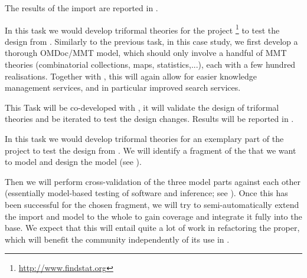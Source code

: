 \begin{workpackage}[id=dksbases,%
  title=Data/Knowledge/Software-Bases,lead=JU,
  ZHRM=12,JURM=46,UWRM=25,SARM=10,LLRM=2,PSRM=4]
\begin{tasklist}
\begin{task}[title=OEIS Case Study (Coverage and automated Import),id=data-OEIS,lead=JU
,PM=6,wphases=12-18]
The results of the import are reported in .
\end{task}


\begin{task}[title=FindStat Case Study (Triformal Theories),id=data-findstat,
  lead=JU,partners={ZH},PM=9,wphases=18-30!.5]
  In this task we would develop triformal theories for the \FindStat project \footnote{\url{http://www.findstat.org}} to test the
  design from .  Similarly to the previous task, in this
  case study, we first develop a thorough OMDoc/MMT model, which should only involve a
  handful of MMT theories (combinatorial collections, maps, statistics,...), each with a
  few hundred realisations. Together with   , this will again allow for
  easier knowledge management services, and in particular improved search services.

  This Task will be co-developed with , it will validate
  the design of triformal theories and be iterated to test the design changes. Results
  will be reported in .
\end{task}

\begin{task}[title=\LMFDB Case Study (Triformal Theories),id=data-LMFDB,
  lead=JU,partners={ZH,UW},PM=24,wphases={12-24!.25,24-48!.7}]
  In this task we would develop triformal theories for an exemplary part of the \LMFDB
  project to test the design from .  We will identify a
  fragment of the \LMFDB that we want to model and design the model (see
  ). 

  Then we will perform cross-validation of the three model parts against each other
  (essentially model-based testing of software and inference; see
  ). Once this has been successful for the chosen fragment, we
  will try to semi-automatically extend the import and model to the whole \LMFDB to gain
  coverage and integrate it fully into the \DKS base. We expect that this will entail
  quite a lot of work in refactoring the \LMFDB proper, which will benefit the \LMFDB
  community independently of its use in \TheProject.


\end{task}
\end{tasklist}
\end{workpackage}
